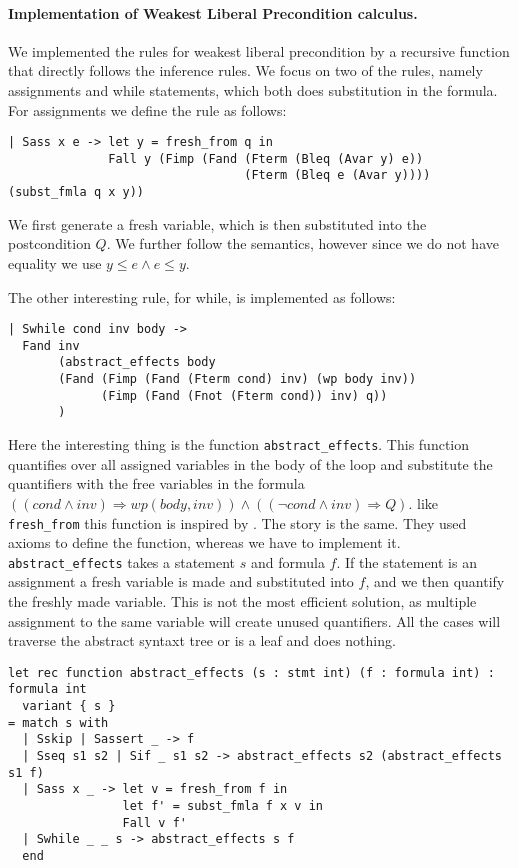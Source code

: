 \paragraph{Implementation of Weakest Liberal Precondition calculus.}
We implemented the rules for weakest liberal precondition by a recursive function that directly
follows the inference rules.
We focus on two of the rules, namely assignments and while statements, which both does substitution in the formula.
For assignments we define the rule as follows:

\begin{lstlisting}
| Sass x e -> let y = fresh_from q in
              Fall y (Fimp (Fand (Fterm (Bleq (Avar y) e))
                                 (Fterm (Bleq e (Avar y)))) (subst_fmla q x y))
\end{lstlisting}

We first generate a fresh variable, which is then substituted into the postcondition $Q$.
We further follow the semantics, however since we do not have equality we use $y \leq e \wedge e \leq y$.

The other interesting rule, for while, is implemented as follows:
\begin{lstlisting}
| Swhile cond inv body ->
  Fand inv
       (abstract_effects body
       (Fand (Fimp (Fand (Fterm cond) inv) (wp body inv))
             (Fimp (Fand (Fnot (Fterm cond)) inv) q))
       )
\end{lstlisting}

Here the interesting thing is the function \texttt{abstract\_effects}. This function quantifies over all assigned variables in the body of the loop and substitute the quantifiers with the free variables in the formula
$((cond \wedge inv) \Rightarrow wp(body,inv)) \wedge ((\neg cond \wedge inv) \Rightarrow Q)$. like \texttt{fresh\_from} this function is inspired by \cite{TODO}. The story is the same. They used axioms to define the function, whereas we have to implement it.
\texttt{abstract\_effects} takes a statement $s$ and formula $f$.
If the statement is an assignment
a fresh variable is made and substituted into $f$, and we then quantify the freshly made variable.
This is not the most efficient solution, as multiple assignment to the same variable will create unused quantifiers.
All the cases will traverse the abstract syntaxt tree or is a leaf and does nothing.

\begin{lstlisting}
let rec function abstract_effects (s : stmt int) (f : formula int) : formula int
  variant { s }
= match s with
  | Sskip | Sassert _ -> f
  | Sseq s1 s2 | Sif _ s1 s2 -> abstract_effects s2 (abstract_effects s1 f)
  | Sass x _ -> let v = fresh_from f in
                let f' = subst_fmla f x v in
                Fall v f'
  | Swhile _ _ s -> abstract_effects s f
  end
\end{lstlisting}

